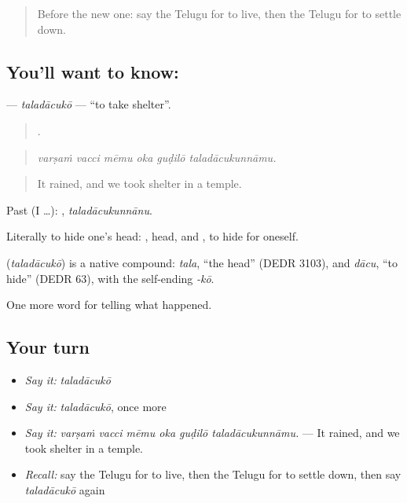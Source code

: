 \label{lesson:TE-C358-taladacuko}



\begin{quote}
Before the new one: say the Telugu for to live, then the Telugu for to settle down.
\end{quote}

\subsection*{You'll want to know: }
\textbf{} — \emph{taladācukō} — \textquotedblleft{}to take shelter\textquotedblright{}.

\begin{quote}
     .
\end{quote}

\begin{quote}
\emph{varṣaṁ vacci mēmu oka guḍilō taladācukunnāmu.}
\end{quote}

\begin{quote}
It rained, and we took shelter in a temple.
\end{quote}

Past (I …): , \emph{taladācukunnānu}.

Literally to hide one's head: , head, and , to hide for oneself.

\begin{cousinweb}
\textbf{} (\emph{taladācukō}) is a native compound: \emph{tala}, \textquotedblleft{}the head\textquotedblright{} (DEDR 3103), and \emph{dācu}, \textquotedblleft{}to hide\textquotedblright{} (DEDR 63), with the self-ending \emph{-kō}.
\end{cousinweb}

\begin{grammarlens}[title={What you've built}]
One more word for telling what happened.
\end{grammarlens}

\subsection*{Your turn}
\begin{itemize}
\raggedright
  \item \emph{Say it:} \emph{taladācukō}
  \item \emph{Say it:} \emph{taladācukō}, once more
  \item \emph{Say it:} \emph{varṣaṁ vacci mēmu oka guḍilō taladācukunnāmu.} — It rained, and we took shelter in a temple.
  \item \emph{Recall:} say the Telugu for to live, then the Telugu for to settle down, then say \emph{taladācukō} again
\end{itemize}

